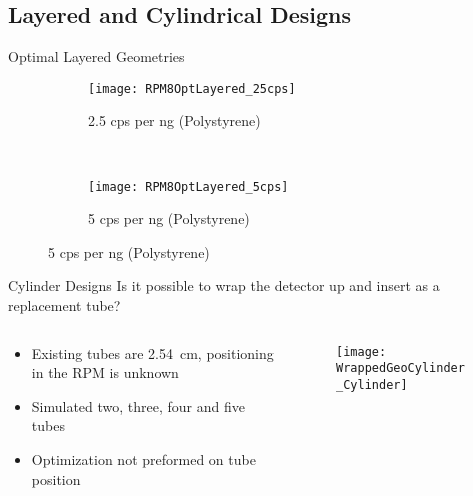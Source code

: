 \subsection{Layered and Cylindrical Designs}
\begin{frame}{Optimal Layered Geometries}
\begin{figure}
    \centering
    \begin{subfigure}[b]{0.45\textwidth}
        \texttt{[image: RPM8OptLayered\_25cps]}
        \caption{2.5 cps per ng  (Polystyrene)}
    \end{subfigure}%
    ~
    \begin{subfigure}[b]{0.45\textwidth}
        \texttt{[image: RPM8OptLayered\_5cps]}
        \caption{5 cps per ng  (Polystyrene)}
    \end{subfigure}
\end{figure}
\end{frame}
\begin{frame}{Cylinder Designs}
Is it possible to wrap the detector up and insert as a replacement tube?
\begin{columns}[onlytextwidth]
  \begin{column}{0.48\textwidth}
    \small
    \begin{itemize}
      \item Existing tubes are \SI{2.54}{\cm}, positioning in the RPM is unknown
      \item Simulated two, three, four and five tubes
      \item Optimization not preformed on tube position
    \end{itemize}
    \end{column}
  \begin{column}{0.5\textwidth}
    \begin{figure}
      \texttt{[image: WrappedGeoCylinder\_Cylinder]}
    \end{figure}
  \end{column}
\end{columns}
\end{frame}
